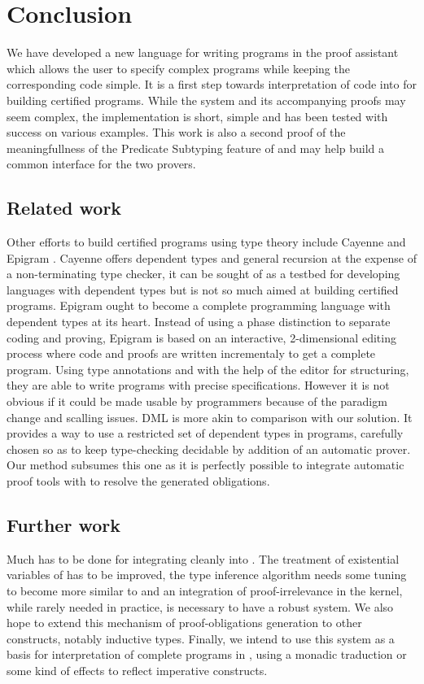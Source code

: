 \documentclass{llncs}
\begin{document}
\section{Conclusion}
We have developed a new language for writing programs in the \Coq proof
assistant which allows the user to specify complex programs while
keeping the corresponding code simple. It is a first step towards
interpretation of \ML code into \Coq for building certified
programs. While the system and its accompanying proofs may seem complex, the
implementation is short, simple and has been tested with success on
various examples. This work is also a second proof of the
meaningfullness of the Predicate Subtyping feature of \PVS{} and may
help build a common interface for the two provers. 

\subsection{Related work}
Other efforts to build certified programs using type theory include
Cayenne \cite{Augustsson99} and Epigram
\cite{DBLP:journals/jfp/McBrideM04}. Cayenne offers dependent
types and general recursion at the expense of a non-terminating type
checker, it can be sought of as a testbed for developing languages with
dependent types but is not so much aimed at building certified programs.
Epigram ought to become a complete programming language with dependent
types at its heart. Instead of using a phase distinction to separate
coding and proving, Epigram is based on an interactive, 2-dimensional editing process
where code and proofs are written incrementaly to get a complete program.
Using type annotations and with the help of the editor for structuring, 
they are able to write programs with precise specifications. However it
is not obvious if it could be made usable by programmers because of the
paradigm change and scalling issues. DML \cite{Xi98:PhD} is more akin to
comparison with our solution. It provides a way to use a restricted set
of dependent types in \ML programs, carefully chosen so as to keep
type-checking decidable by addition of an automatic prover. Our method
subsumes this one as it is perfectly possible to integrate automatic
proof tools with \Coq to resolve the generated obligations.

\subsection{Further work}
Much has to be done for integrating \Russell cleanly into \Coq. The
treatment of existential variables of \Coq has to be improved, the
type inference algorithm needs some tuning to become more similar to \ML
and an integration of proof-irrelevance in the kernel, while rarely needed in
practice, is necessary to have a robust system.
We also hope to extend this mechanism of proof-obligations generation to other
constructs, notably inductive types. Finally, we intend to use this system as a
basis for interpretation of complete \ML{} programs in \Coq, using a monadic
traduction or some kind of effects to reflect imperative constructs.
\end{document}
